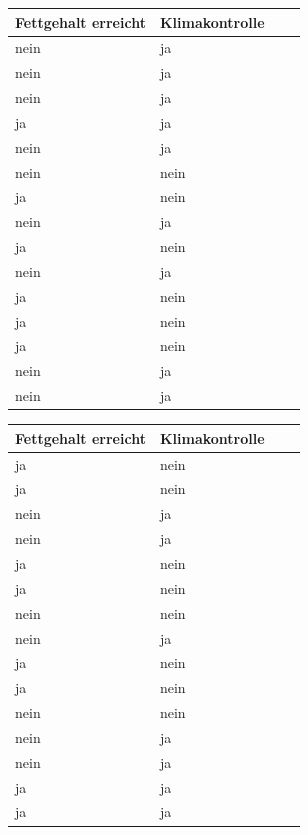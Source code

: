\documentclass[a4paper, 9pt]{scrartcl}\usepackage[]{graphicx}\usepackage[]{xcolor}
\begin{document}
\vspace{1Ex}

\begin{center}
\begin{minipage}[t]{0.45\textwidth}
\begin{center}

\begin{tabular}{p{2.5cm}p{2.5cm}p{2.5cm}p{2.5cm}}
\toprule
Fettgehalt erreicht & Klimakontrolle\\
\midrule
nein & ja\\
nein & ja\\
nein & ja\\
ja & ja\\
nein & ja\\
\addlinespace
nein & nein\\
ja & nein\\
nein & ja\\
ja & nein\\
nein & ja\\
\addlinespace
ja & nein\\
ja & nein\\
ja & nein\\
nein & ja\\
nein & ja\\
\bottomrule
\end{tabular}


\end{center}
\end{minipage}
\begin{minipage}[t]{0.45\textwidth}
\begin{center}

\begin{tabular}{p{2.5cm}p{2.5cm}p{2.5cm}p{2.5cm}}
\toprule
Fettgehalt erreicht & Klimakontrolle\\
\midrule
ja & nein\\
ja & nein\\
nein & ja\\
nein & ja\\
ja & nein\\
\addlinespace
ja & nein\\
nein & nein\\
nein & ja\\
ja & nein\\
ja & nein\\
\addlinespace
nein & nein\\
nein & ja\\
nein & ja\\
ja & ja\\
ja & ja\\
\bottomrule
\end{tabular}


\end{center}
\end{minipage}
\end{center}
\end{document}
